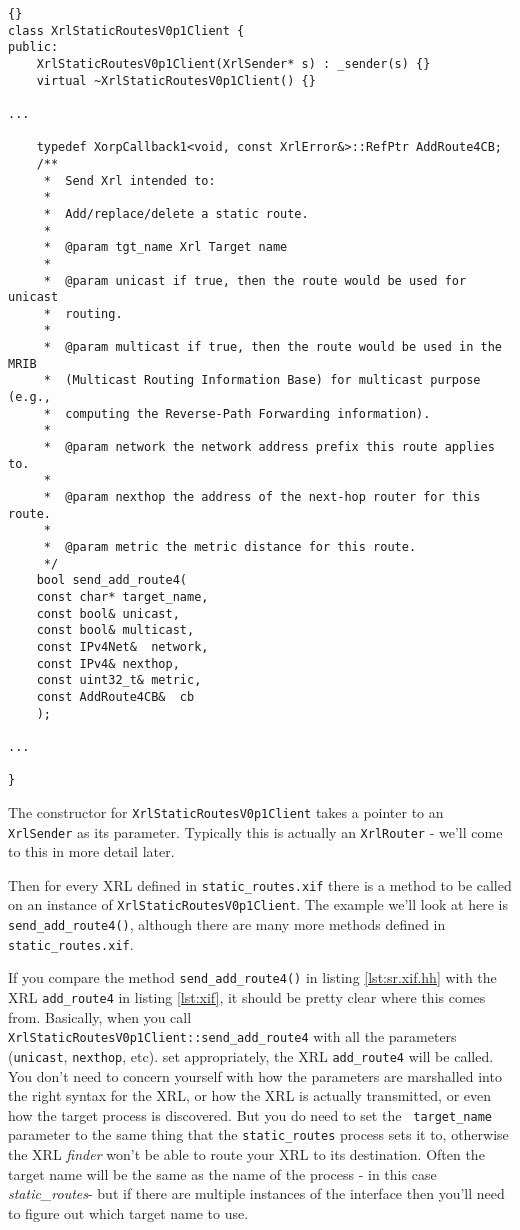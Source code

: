 \documentclass[11pt]{article}
\newcommand{\stt}{\tt\small}
\newcommand{\SR}{{\tt\small static\_routes}\xspace}
\newcommand{\SRI}{{\it static\_routes}\xspace}
\begin{document}
\begin{lstlisting}[caption={ Fragment from {\tt\small static\_routes\_xif.hh} %
                                     \label{lst:sr.xif.hh} } ]{}
class XrlStaticRoutesV0p1Client {
public:
    XrlStaticRoutesV0p1Client(XrlSender* s) : _sender(s) {}
    virtual ~XrlStaticRoutesV0p1Client() {}

...

    typedef XorpCallback1<void, const XrlError&>::RefPtr AddRoute4CB;
    /**
     *  Send Xrl intended to:
     *
     *  Add/replace/delete a static route.
     *
     *  @param tgt_name Xrl Target name
     *
     *  @param unicast if true, then the route would be used for unicast
     *  routing.
     *
     *  @param multicast if true, then the route would be used in the MRIB
     *  (Multicast Routing Information Base) for multicast purpose (e.g.,
     *  computing the Reverse-Path Forwarding information).
     *
     *  @param network the network address prefix this route applies to.
     *
     *  @param nexthop the address of the next-hop router for this route.
     *
     *  @param metric the metric distance for this route.
     */
    bool send_add_route4(
	const char*	target_name,
	const bool&	unicast,
	const bool&	multicast,
	const IPv4Net&	network,
	const IPv4&	nexthop,
	const uint32_t&	metric,
	const AddRoute4CB&	cb
    );

...

}
\end{lstlisting}
\newpage
The constructor for {\stt XrlStaticRoutesV0p1Client} takes a pointer to
an {\stt XrlSender} as its parameter.  Typically this is actually an
{\stt XrlRouter} - we'll come to this in more detail later.

Then for every XRL defined in {\stt static\_routes.xif} there is a
method to be called on an instance of {\stt XrlStaticRoutesV0p1Client}.
The example we'll look at here is {\stt send\_add\_route4()}, although
there are many more methods defined in {\stt static\_routes.xif}.

If you compare the method {\stt send\_add\_route4()} in listing
\ref{lst:sr.xif.hh} with the XRL {\stt add\_route4} in listing
\ref{lst:xif}, it should be pretty clear where this comes from.
Basically, when you call \\
{\stt XrlStaticRoutesV0p1Client::send\_add\_route4} with all the
parameters ({\stt unicast}, {\stt nexthop}, etc).  set appropriately,
the XRL {\stt add\_route4} will be called.  You don't need to concern
yourself with how the parameters are marshalled into the right syntax
for the XRL, or how the XRL is actually transmitted, or even how the
target process is discovered.  But you do need to set the {\stt
target\_name} parameter to the same thing that the \SR process sets it
to, otherwise the XRL {\it finder} won't be able to route your XRL to
its destination.  Often the target name will be the same as the name
of the process - in this case \SRI - but if there are multiple
instances of the interface then you'll need to figure out which target
name to use.
\end{document}
